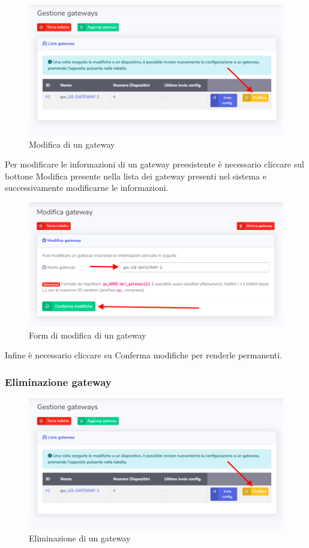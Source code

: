 		\begin{figure}[H]
		\centering
		\includegraphics[scale=0.500]{res/images/admin/selModGateway.png}
		\caption{Modifica di un gateway}
	\end{figure}

		Per modificare le informazioni di un gateway preesistente è necessario cliccare sul bottone Modifica presente nella lista dei gateway presenti nel sistema e successivamente modificarne le informazioni.

		\begin{figure}[H]
		\centering
		\includegraphics[scale=0.500]{res/images/admin/modGateway.png}
		\caption{Form di modifica di un gateway}
	\end{figure}

		Infine è necessario cliccare su Conferma modifiche per renderle permanenti.

	\subsubsection{Eliminazione gateway}

		\begin{figure}[H]
		\centering
		\includegraphics[scale=0.500]{res/images/admin/selModGateway.png}
		\caption{Eliminazione di un gateway}
	\end{figure}

